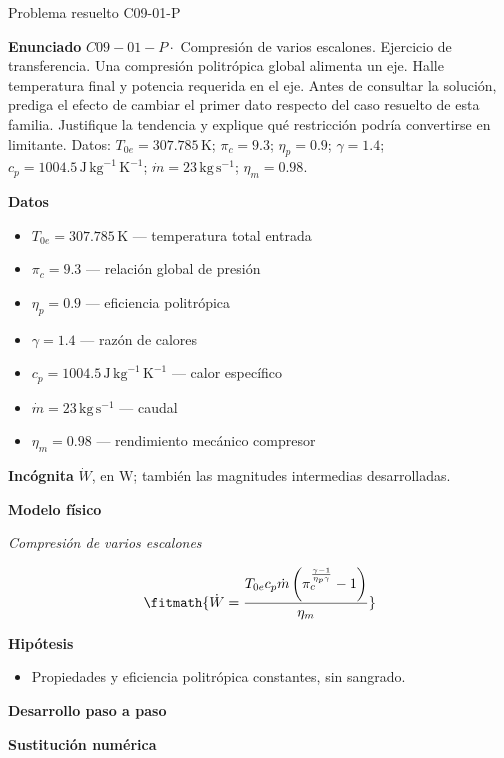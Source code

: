 \documentclass[10pt,openany]{book}
\begin{document}
\begin{studiumworked}{Problema resuelto C09-01-P}


\noindent\textbf{Enunciado}
\(C09-01-P \cdot\) Compresión de varios escalones. Ejercicio de transferencia. Una compresión politrópica global alimenta un eje. Halle temperatura final y potencia requerida en el eje. Antes de consultar la solución, prediga el efecto de cambiar el primer dato respecto del caso resuelto de esta familia. Justifique la tendencia y explique qué restricción podría convertirse en limitante. Datos: \(T_{0e}=307.785\, \mathrm{K}\); \(\pi_c=9.3\); \(\eta_p=0.9\); \(\gamma=1.4\); \(c_p=1004.5\, \mathrm{J}\,\mathrm{kg}^{-1}\,\mathrm{K}^{-1}\); \(\dot m=23\, \mathrm{kg}\,\mathrm{s}^{-1}\); \(\eta_m=0.98\).

\noindent\textbf{Datos}
\begin{itemize}
\item $T_{0e} = 307.785\,\mathrm{K}$ — temperatura total entrada
\item $\pi_c = 9.3$ — relación global de presión
\item $\eta_p = 0.9$ — eficiencia politrópica
\item $\gamma = 1.4$ — razón de calores
\item $c_p = 1004.5\,\mathrm{J}\,\mathrm{kg}^{-1}\,\mathrm{K}^{-1}$ — calor específico
\item $\dot m = 23\,\mathrm{kg}\,\mathrm{s}^{-1}$ — caudal
\item $\eta_m = 0.98$ — rendimiento mecánico compresor
\end{itemize}

\noindent\textbf{Incógnita}
$\dot{W}$, en $\mathrm{W}$; también las magnitudes intermedias desarrolladas.

\noindent\textbf{Modelo físico}

\noindent\textit{Compresión de varios escalones}

\[
\fitmath{\dot{W}=\frac{T_{0e} c_p \dot m \left(\pi_c^{\frac{\gamma - 1}{\eta_p \gamma}} - 1\right)}{\eta_m}}
\]

\noindent\textbf{Hipótesis}
\begin{itemize}
\item Propiedades y eficiencia politrópica constantes, sin sangrado.
\end{itemize}

\noindent\textbf{Desarrollo paso a paso}



\noindent\textbf{Sustitución numérica}


\end{studiumworked}
\end{document}
